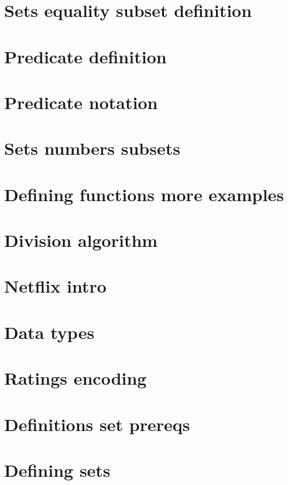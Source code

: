 
\section*{Sets equality subset definition}

\vfill
\section*{Predicate definition}

\vfill
\section*{Predicate notation}

\vfill
\section*{Sets numbers subsets}

\vfill
\section*{Defining functions more examples}

\vfill
\section*{Division algorithm}

\vfill
\section*{Netflix intro}

\vfill
\section*{Data types}

\vfill
\section*{Ratings encoding}

\vfill
\section*{Definitions set prereqs}

\vfill
\section*{Defining sets}

\vfill
